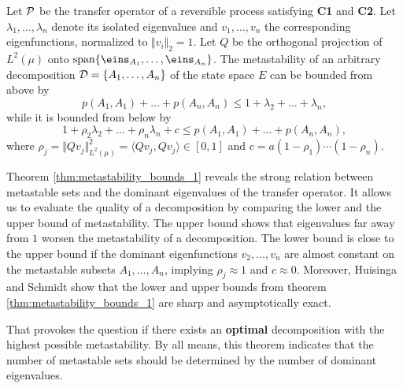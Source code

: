{{%
\begin{thm}
\label{thm:metastability_bounds_1}
Let $\mathcal{P}$ be the transfer operator of a reversible process satisfying \textrm{\textbf{\textsf{C1}}} and \textrm{\textbf{\textsf{C2}}}.
Let $\lambda_1,\dots,\lambda_n$ denote its isolated eigenvalues and $v_1,\dots,v_n$ the corresponding eigenfunctions, normalized to $\Vert v_i \Vert_2 = 1$.
Let $Q$ be the orthogonal projection of $L^2(\mu)$ onto $\mathrm{span}\{\eins_{A_1},\dots, \eins_{A_n}\}$.
The metastability of an arbitrary decomposition $\mathcal{D} = \{A_1,\dots, A_n\}$ of the state space $E$ can be bounded from above by
\begin{equation*}
p(A_1,A_1) + \dots + p(A_n, A_n) \leq 1+ \lambda_2 + \dots + \lambda_n,
\end{equation*}
while it is bounded from below by
\begin{equation*}
1+ \rho_2 \lambda_2 + \dots + \rho_n \lambda_n + c \leq p(A_1,A_1) + \dots + p(A_n, A_n),
\end{equation*}
where $\rho_j = \Vert Q v_j \Vert_{L^2(\mu)}^2 = \langle Qv_j, Qv_j \rangle \in [0,1]$ and $c = a(1-\rho_1) \cdots (1 - \rho_n)$.
\end{thm}

Theorem \ref{thm:metastability_bounds_1} reveals the strong relation between metastable sets and the dominant eigenvalues of the transfer operator.
It allows us to evaluate the quality of a decomposition by comparing the lower and the upper bound of metastability.
The upper bound shows that eigenvalues far away from $1$ worsen the metastability of a decomposition.
The lower bound is close to the upper bound if the dominant eigenfunctions $v_2,\dots,v_n$ are almost constant on the metastable subsets $A_1,\dots,A_n$, implying $\rho_j \approx 1$ and $c \approx 0$.
Moreover, Huisinga and Schmidt\cite{huisinga2006metastability} show that the lower and upper bounds from theorem \ref{thm:metastability_bounds_1} are sharp and asymptotically exact.

That provokes the question if there exists an \textbf{optimal} decomposition with the highest possible metastability. 
By all means, this theorem indicates that the number of metastable sets should be determined by the number of dominant eigenvalues.
\\

}}

